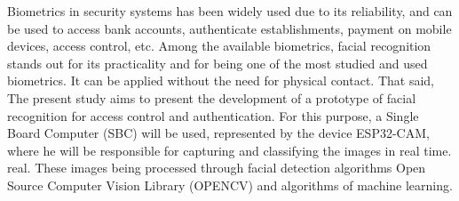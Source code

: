 
\begin{abstractutfpr}%
Biometrics in security systems has been widely used due to its
reliability, and can be used to access bank accounts, authenticate
establishments, payment on mobile devices, access control, etc.
Among the available biometrics, facial recognition stands out for its
practicality and for being one of the most studied and used biometrics.
It can be applied without the need for physical contact. That said,
The present study aims to present the development of a prototype of
facial recognition for access control and authentication. For this purpose,
a Single Board Computer (SBC) will be used, represented by the device
ESP32-CAM, where he will be responsible for capturing and classifying the images in real time.
real. These images being processed through facial detection algorithms
Open Source Computer Vision Library (OPENCV) and algorithms
of machine learning.
\end{abstractutfpr}
